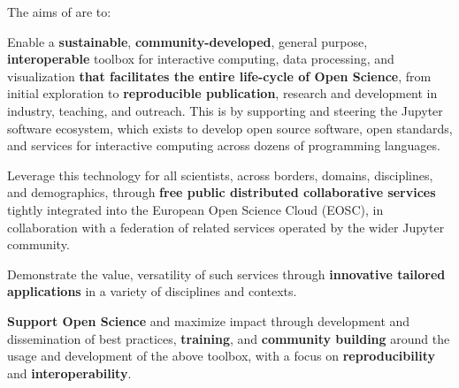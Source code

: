 \medskip
\noindent The aims of \TheProject are to:

\begin{compactenum}
\item Enable a
  \textbf{sustainable}, \textbf{community-developed}, general purpose, \textbf{interoperable} toolbox for
  interactive computing, data processing, and visualization
  \textbf{that facilitates the entire life-cycle of Open Science},
  from initial exploration to \textbf{reproducible publication}, research and development in
  industry, teaching, and outreach.
  This is by supporting and steering the Jupyter software ecosystem,
  which exists to develop open source software,
  open standards, and services for interactive computing across dozens of programming languages.

\item Leverage this technology for all scientists, across borders,
  domains, disciplines, and demographics, through
  \textbf{free public distributed collaborative services} tightly integrated
  into the European Open Science Cloud (EOSC),
  in collaboration with a federation of related services
  operated by the wider Jupyter community.

\item Demonstrate the value, versatility of such services through
  \textbf{innovative tailored applications} in a variety of disciplines and
  contexts.

\item \textbf{Support Open Science} and maximize impact through development and
  dissemination of best practices,
  \textbf{training}, and \textbf{community building}
  around the usage and development of the above toolbox,
  with a focus on \textbf{reproducibility} and
  \textbf{interoperability}.
\end{compactenum}


